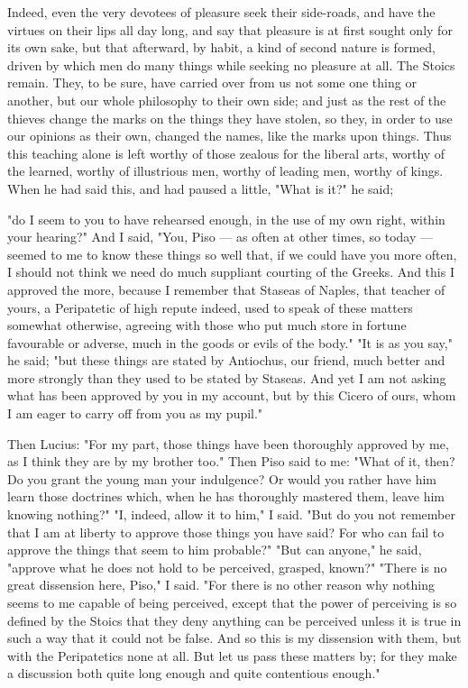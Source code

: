  Indeed, even the very devotees of pleasure seek their side-roads, and have the virtues on their lips all day long, and say that pleasure is at first sought only for its own sake, but that afterward, by habit, a kind of second nature is formed, driven by which men do many things while seeking no pleasure at all. The Stoics remain. They, to be sure, have carried over from us not some one thing or another, but our whole philosophy to their own side; and just as the rest of the thieves change the marks on the things they have stolen, so they, in order to use our opinions as their own, changed the names, like the marks upon things. Thus this teaching alone is left worthy of those zealous for the liberal arts, worthy of the learned, worthy of illustrious men, worthy of leading men, worthy of kings. When he had said this, and had paused a little, "What is it?" he said;

 "do I seem to you to have rehearsed enough, in the use of my own right, within your hearing?" And I said, "You, Piso — as often at other times, so today — seemed to me to know these things so well that, if we could have you more often, I should not think we need do much suppliant courting of the Greeks. And this I approved the more, because I remember that Staseas of Naples, that teacher of yours, a Peripatetic of high repute indeed, used to speak of these matters somewhat otherwise, agreeing with those who put much store in fortune favourable or adverse, much in the goods or evils of the body." "It is as you say," he said; "but these things are stated by Antiochus, our friend, much better and more strongly than they used to be stated by Staseas. And yet I am not asking what has been approved by you in my account, but by this Cicero of ours, whom I am eager to carry off from you as my pupil."

 Then Lucius: "For my part, those things have been thoroughly approved by me, as I think they are by my brother too." Then Piso said to me: "What of it, then? Do you grant the young man your indulgence? Or would you rather have him learn those doctrines which, when he has thoroughly mastered them, leave him knowing nothing?" "I, indeed, allow it to him," I said. "But do you not remember that I am at liberty to approve those things you have said? For who can fail to approve the things that seem to him probable?" "But can anyone," he said, "approve what he does not hold to be perceived, grasped, known?" "There is no great dissension here, Piso," I said. "For there is no other reason why nothing seems to me capable of being perceived, except that the power of perceiving is so defined by the Stoics that they deny anything can be perceived unless it is true in such a way that it could not be false. And so this is my dissension with them, but with the Peripatetics none at all. But let us pass these matters by; for they make a discussion both quite long enough and quite contentious enough."

